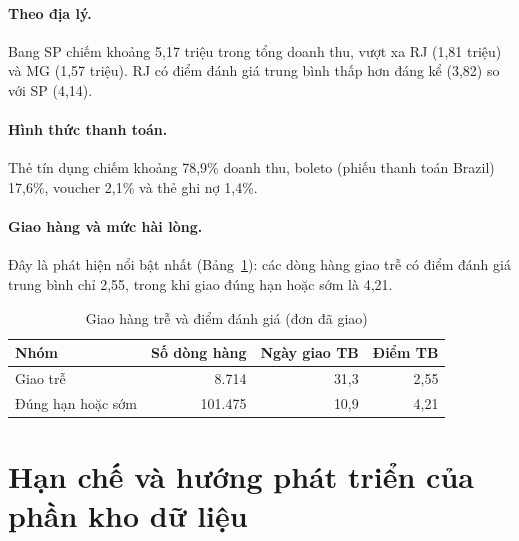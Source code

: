 \documentclass[12pt,a4paper]{article}
\begin{document}
\paragraph{Theo địa lý.}
Bang SP chiếm khoảng 5,17 triệu trong tổng doanh thu, vượt xa RJ (1,81 triệu) và MG (1,57 triệu). RJ có điểm đánh giá
trung bình thấp hơn đáng kể (3,82) so với SP (4,14).

\paragraph{Hình thức thanh toán.}
Thẻ tín dụng chiếm khoảng 78,9\% doanh thu, boleto (phiếu thanh toán Brazil) 17,6\%, voucher 2,1\% và thẻ ghi nợ 1,4\%.

\paragraph{Giao hàng và mức hài lòng.}
Đây là phát hiện nổi bật nhất (Bảng~\ref{tab:delay}): các dòng hàng giao trễ có điểm đánh giá trung bình chỉ
2,55, trong khi giao đúng hạn hoặc sớm là 4,21.

\begin{table}[h]
\centering
\caption{Giao hàng trễ và điểm đánh giá (đơn đã giao)}\label{tab:delay}
\small
\begin{tabular}{@{}l r r r@{}}
\toprule
\textbf{Nhóm} & \textbf{Số dòng hàng} & \textbf{Ngày giao TB} & \textbf{Điểm TB}\\
\midrule
Giao trễ & 8.714 & 31,3 & 2,55\\
Đúng hạn hoặc sớm & 101.475 & 10,9 & 4,21\\
\bottomrule
\end{tabular}
\end{table}

\section{Hạn chế và hướng phát triển của phần kho dữ liệu}
\end{document}
